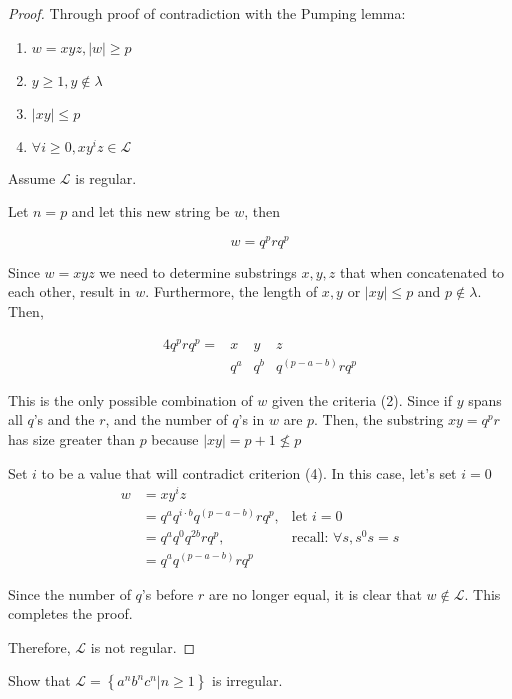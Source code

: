 \begin{proof}
    Through proof of contradiction with the Pumping lemma: 
    \begin{enumerate}
        \item $w=xyz, |w| \geq p$
        \item $y\geq 1, y\notin\lambda$
        \item $|xy|\leq p$
        \item $\forall i\geq 0, xy^iz\in\mathcal{L}$
    \end{enumerate}
    
    Assume $\mathcal{L}$ is regular.
    
    Let $n = p$ and let this new string be $w$, then
    
    \[
    w = q^p r q^p
    \]
    
    Since $w=xyz$ we need to determine substrings $x,y,z$ that when concatenated to each other, result in $w$. Furthermore, the length of $x,y$ or $|xy|\leq p$ and $p\notin \lambda$. Then,
    
   \begin{alignat*}{4}
        q^prq^p = & x  & y  & z \\
                  & q^a & q^b &q^{(p-a-b)} r q^p
    \end{alignat*}
    
    This is the only possible combination of $w$ given the criteria (2). Since if $y$ spans all $q$'s and the $r$, and the number of $q$'s in $w$ are $p$. Then, the substring $xy=q^pr$ has size greater than $p$ because $|xy| =p+1\nleq p$
    
    Set $i$ to be a value that will contradict criterion (4). In this case, let's set $i=0$
    \begin{align*}
        w & = xy^iz \\
          & = q^aq^{i\cdot b}q^{(p-a-b)}rq^p,& \text{let } i = 0 \\
          & = q^aq^{0}q^{2b}rq^p,& \text{recall: } \forall s,s^0s = s \\
          & = q^a q^{(p-a-b)}rq^p
    \end{align*}
    
Since the number of $q$'s before $r$ are no longer equal, it is clear that $w\notin \mathcal{L}$. This completes the proof.
    
    Therefore, $\mathcal{L}$ is not regular.
\end{proof}

\begin{ex}
    Show that $\mathcal{L} = \left\{a^nb^nc^n|n\geq 1\right\}$ is irregular.
\end{ex}

